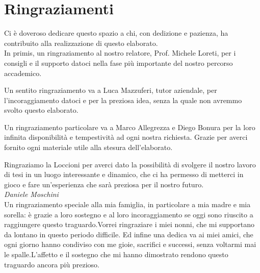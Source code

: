 \chapter*{Ringraziamenti}
Ci è doveroso dedicare questo spazio a chi, con dedizione e pazienza, ha contribuito alla realizzazione di questo elaborato.\\

In primis, un ringraziamento al nostro relatore, Prof. Michele Loreti, per i consigli e il supporto datoci nella fase più importante del nostro percorso accademico.

Un sentito ringraziamento va a Luca Mazzuferi, tutor aziendale, per l'incoraggiamento datoci e per la preziosa idea, senza la quale non avremmo svolto questo elaborato. 

Un ringraziamento particolare va a Marco Allegrezza e Diego Bonura per la loro infinita disponibilità e tempestività ad ogni nostra richiesta. Grazie per averci fornito ogni materiale utile alla stesura dell’elaborato.

Ringraziamo la Loccioni per averci dato la possibilità di svolgere il nostro lavoro di tesi in un luogo interessante e dinamico, che ci ha permesso di metterci in gioco e fare un’esperienza che sarà preziosa per il nostro futuro.\\

\textit{Daniele Moschini}\\
Un ringraziamento speciale alla mia famiglia, in particolare a mia madre e mia sorella: è grazie a loro sostegno e al loro incoraggiamento se oggi sono riuscito a raggiungere questo traguardo.Vorrei ringraziare i miei nonni, che mi supportano da lontano in questo periodo difficile.
Ed infine una dedica va ai miei amici, che ogni giorno hanno condiviso con me gioie, sacrifici e successi, senza voltarmi mai le spalle.L’affetto e il sostegno che mi hanno dimostrato rendono questo traguardo ancora più prezioso.



